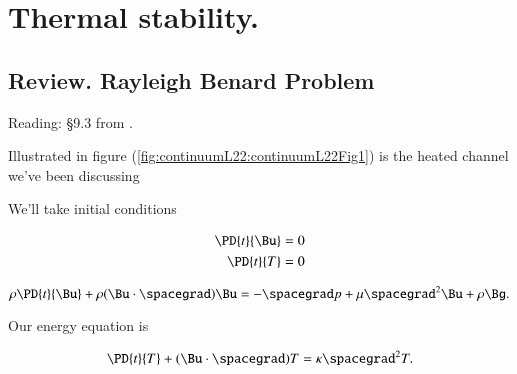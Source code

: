 %
%

\chapter{Thermal stability.}
\label{chap:continuumL22}
{}
\date{Apr 4, 2012}

\beginArtWithToc

%

\section{Review.  Rayleigh Benard Problem}

Reading: \S 9.3 from \cite{acheson1990elementary}.

Illustrated in figure (\ref{fig:continuumL22:continuumL22Fig1}) is the heated channel we've been discussing


We'll take initial conditions

\begin{align}\label{eqn:continuumL22:10}
\PD{t}{\Bu} &= 0 \\
\PD{t}{T} &= 0
\end{align}

\begin{equation}\label{eqn:continuumL22:30}
\rho \PD{t}{\Bu} + \rho (\Bu \cdot \spacegrad) \Bu = - \spacegrad p + \mu \spacegrad^2 \Bu + \rho \Bg.
\end{equation}

Our energy equation is

\begin{equation}\label{eqn:continuumL22:50}
\PD{t}{T} + (\Bu \cdot \spacegrad) T = \kappa \spacegrad^2 T.
\end{equation}

